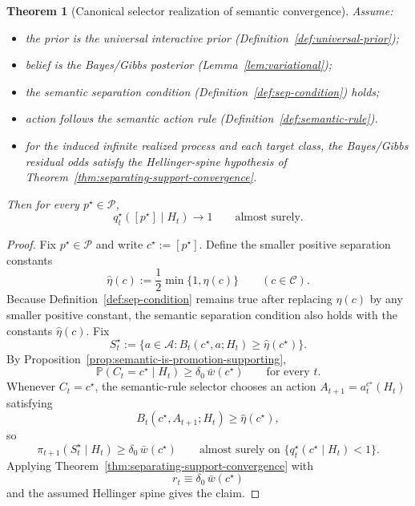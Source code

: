 \documentclass[11pt]{article}
\newtheorem{theorem}{Theorem}[section]
\theoremstyle{definition}
\theoremstyle{remark}
\newcommand{\Acal}{\mathcal{A}}
\newcommand{\Ccal}{\mathcal{C}}
\newcommand{\Pcal}{\mathcal{P}}
\newcommand{\Prob}{\mathbb{P}}
\begin{document}
\begin{theorem}[Canonical selector realization of semantic convergence]
\label{thm:semantic-convergence}
Assume:
\begin{itemize}
\item[(C1)] the prior is the universal interactive prior (Definition~\ref{def:universal-prior});
\item[(C2)] belief is the Bayes/Gibbs posterior (Lemma~\ref{lem:variational});
\item[(C3)] the semantic separation condition (Definition~\ref{def:sep-condition}) holds;
\item[(C4)] action follows the semantic action rule (Definition~\ref{def:semantic-rule}).
\item[(C5)] for the induced infinite realized process and each target class, the Bayes/Gibbs residual odds satisfy the Hellinger-spine hypothesis of Theorem~\ref{thm:separating-support-convergence}.
\end{itemize}
Then for every $p^\star\in\Pcal$,
\[
q_t^\star([p^\star]\mid H_t)\longrightarrow 1
\qquad
\text{almost surely.}
\]
\end{theorem}

\begin{proof}
Fix $p^\star\in\Pcal$ and write $c^\star:=[p^\star]$.
Define the smaller positive separation constants
\[
\hat\eta(c):=\frac{1}{2}\min\{1,\eta(c)\}
\qquad
(c\in\Ccal).
\]
Because Definition~\ref{def:sep-condition} remains true after replacing $\eta(c)$ by any smaller positive constant, the semantic separation condition also holds with the constants $\hat\eta(c)$. Fix
\[
S_t^\star:=\{a\in\Acal:B_t(c^\star,a;H_t)\ge \hat\eta(c^\star)\}.
\]
By Proposition~\ref{prop:semantic-is-promotion-supporting},
\[
\Prob(C_t=c^\star\mid H_t)\ge \delta_0\,\bar w(c^\star)
\qquad\text{for every }t.
\]
Whenever $C_t=c^\star$, the semantic-rule selector chooses an action $A_{t+1}=a_t^{c^\star}(H_t)$ satisfying
\[
B_t(c^\star,A_{t+1};H_t)\ge \hat\eta(c^\star),
\]
so
\[
\pi_{t+1}(S_t^\star\mid H_t)\ge \delta_0\,\bar w(c^\star)
\qquad\text{almost surely on }\{q_t^\star(c^\star\mid H_t)<1\}.
\]
Applying Theorem~\ref{thm:separating-support-convergence} with
\[
r_t\equiv \delta_0\,\bar w(c^\star)
\]
and the assumed Hellinger spine gives the claim.
\end{proof}
\end{document}
